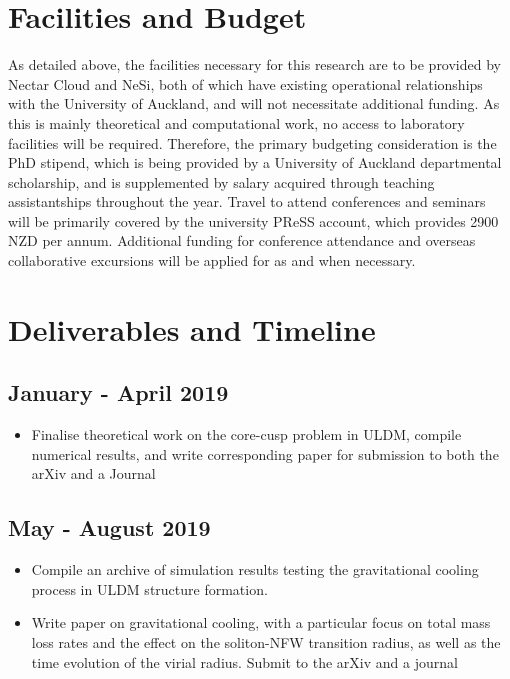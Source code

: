 \section{Facilities and Budget}

As detailed above, the facilities necessary for this research are to be provided by Nectar Cloud and NeSi, both of which have existing operational relationships with the University of Auckland, and will not necessitate additional funding. As this is mainly theoretical and computational work, no access to laboratory facilities will be required. Therefore, the primary budgeting consideration is the PhD stipend, which is being provided by a University of Auckland departmental scholarship, and is supplemented by salary acquired through teaching assistantships throughout the year. Travel to attend conferences and seminars will be primarily covered by the university PReSS account, which provides 2900 NZD per annum. Additional funding for conference attendance and overseas collaborative excursions will be applied for as and when necessary.


\section{Deliverables and Timeline}

\subsection*{January - April 2019}
\begin{itemize}
    \item Finalise theoretical work on the core-cusp problem in ULDM, compile numerical results, and write corresponding paper for submission to both the arXiv and a Journal
\end{itemize}

\subsection*{May - August 2019}
\begin{itemize}
    \item Compile an archive of simulation results testing the gravitational cooling process in ULDM structure formation. 
    \item Write paper on gravitational cooling, with a particular focus on total mass loss rates and the effect on the soliton-NFW transition radius, as well as the time evolution of the virial radius. Submit to the arXiv and a journal
\end{itemize}

